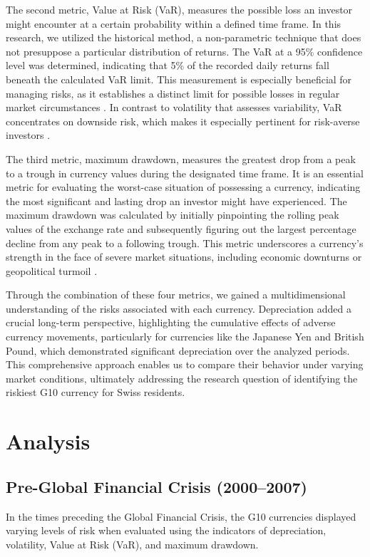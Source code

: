 \documentclass[11pt,a4paper,english,oneside]{book}
\begin{document}
The second metric, Value at Risk (VaR), measures the possible loss an investor might encounter at a certain probability within a defined time frame. In this research, we utilized the historical method, a non-parametric technique that does not presuppose a particular distribution of returns. The VaR at a 95\% confidence level was determined, indicating that 5\% of the recorded daily returns fall beneath the calculated VaR limit. This measurement is especially beneficial for managing risks, as it establishes a distinct limit for possible losses in regular market circumstances \parencite{manganelli2001value}. In contrast to volatility that assesses variability, VaR concentrates on downside risk, which makes it especially pertinent for risk-averse investors \parencite{artzner1999coherent}.

The third metric, maximum drawdown, measures the greatest drop from a peak to a trough in currency values during the designated time frame. It is an essential metric for evaluating the worst-case situation of possessing a currency, indicating the most significant and lasting drop an investor might have experienced. The maximum drawdown was calculated by initially pinpointing the rolling peak values of the exchange rate and subsequently figuring out the largest percentage decline from any peak to a following trough. This metric underscores a currency's strength in the face of severe market situations, including economic downturns or geopolitical turmoil \parencite{stan2014computation}.

Through the combination of these four metrics, we gained a multidimensional understanding of the risks associated with each currency. Depreciation added a crucial long-term perspective, highlighting the cumulative effects of adverse currency movements, particularly for currencies like the Japanese Yen and British Pound, which demonstrated significant depreciation over the analyzed periods. This comprehensive approach enables us to compare their behavior under varying market conditions, ultimately addressing the research question of identifying the riskiest G10 currency for Swiss residents.
\chapter{Analysis}
\section{Pre-Global Financial Crisis (2000–2007)}
In the times preceding the Global Financial Crisis, the G10 currencies displayed varying levels of risk when evaluated using the indicators of depreciation, volatility, Value at Risk (VaR), and maximum drawdown.
\end{document}

